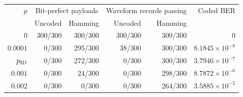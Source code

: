 \begin{tabular}{rrrrrr}
\toprule
$p$ & \multicolumn{2}{c}{Bit-perfect payloads} & \multicolumn{2}{c}{Waveform records passing} & Coded BER \\
& Uncoded & Hamming & Uncoded & Hamming & \\
\midrule
$0$ & 300/300 & 300/300 & 300/300 & 300/300 & $0$ \\
$0.0001$ & 0/300 & 295/300 & 38/300 & 300/300 & $8.1845\times10^{-8}$ \\
$p_{\rm ID}$ & 0/300 & 272/300 & 0/300 & 300/300 & $3.7946\times10^{-7}$ \\
$0.001$ & 0/300 & 24/300 & 0/300 & 298/300 & $8.7872\times10^{-6}$ \\
$0.002$ & 0/300 & 0/300 & 0/300 & 264/300 & $3.5885\times10^{-5}$ \\
\bottomrule
\end{tabular}
